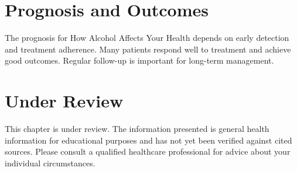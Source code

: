 \section*{Prognosis and Outcomes}
The prognosis for How Alcohol Affects Your Health depends on early detection and treatment adherence. Many patients respond well to treatment and achieve good outcomes. Regular follow-up is important for long-term management.
\section*{Under Review}
This chapter is under review. The information presented is general health information for educational purposes and has not yet been verified against cited sources. Please consult a qualified healthcare professional for advice about your individual circumstances.


\clearpage
